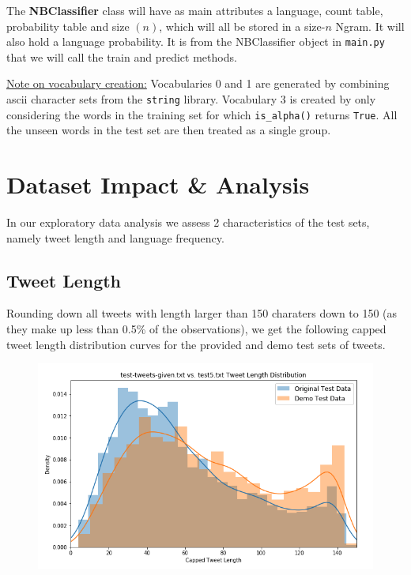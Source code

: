 \documentclass[runningheads]{llncs}
\newcommand{\code}[1]{\texttt{#1}}
\begin{document}
\medskip

The \textbf{NBClassifier} class will have as main attributes a language, count table, probability table and size $(n)$, which will all be stored in a size-$n$ Ngram. It will also hold a language probability. It is from the NBClassifier object in \code{main.py} that we will call the train and predict methods.

\medskip

\underline{Note on vocabulary creation:} Vocabularies 0 and 1 are generated by combining ascii character sets from the \code{string} library. Vocabulary 3 is created by only considering the words in the training set for which \code{is\_alpha()} returns \code{True}. All the unseen words in the test set are then treated as a single group.

\newpage

\section{Dataset Impact \& Analysis}

In our exploratory data analysis we assess 2 characteristics of the test sets, namely tweet length and language frequency.

\subsection{Tweet Length}

Rounding down all tweets with length larger than 150 charaters down to 150 (as they make up less than 0.5\% of the observations), we get the following capped tweet length distribution curves for the provided and demo test sets of tweets.

\begin{figure}
    \begin{center}
        \includegraphics[width=12.5cm]{images/tlendist.png}
    \end{center}
\end{figure}
\end{document}
